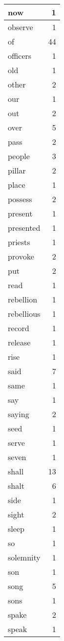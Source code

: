 \begin{center}
\begin{longtable}{l|r}
now & 1 \\ \hline
observe & 1 \\ \hline
of & 44 \\ \hline
officers & 1 \\ \hline
old & 1 \\ \hline
other & 2 \\ \hline
our & 1 \\ \hline
out & 2 \\ \hline
over & 5 \\ \hline
pass & 2 \\ \hline
people & 3 \\ \hline
pillar & 2 \\ \hline
place & 1 \\ \hline
possess & 2 \\ \hline
present & 1 \\ \hline
presented & 1 \\ \hline
priests & 1 \\ \hline
provoke & 2 \\ \hline
put & 2 \\ \hline
read & 1 \\ \hline
rebellion & 1 \\ \hline
rebellious & 1 \\ \hline
record & 1 \\ \hline
release & 1 \\ \hline
rise & 1 \\ \hline
said & 7 \\ \hline
same & 1 \\ \hline
say & 1 \\ \hline
saying & 2 \\ \hline
seed & 1 \\ \hline
serve & 1 \\ \hline
seven & 1 \\ \hline
shall & 13 \\ \hline
shalt & 6 \\ \hline
side & 1 \\ \hline
sight & 2 \\ \hline
sleep & 1 \\ \hline
so & 1 \\ \hline
solemnity & 1 \\ \hline
son & 1 \\ \hline
song & 5 \\ \hline
sons & 1 \\ \hline
spake & 2 \\ \hline
speak & 1 \\ \hline

\end{longtable}
\end{center}
